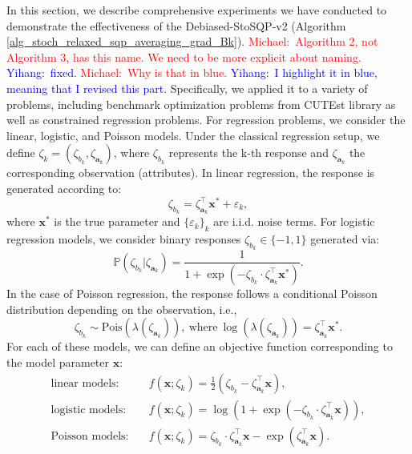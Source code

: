 \documentclass[aos]{imsart}
\numberwithin{equation}{section}
\theoremstyle{plain}
\newcommand{\michael}[1]{\textcolor{red}{Michael:\ #1}}
\newcommand{\yihang}[1]{\textcolor{blue}{Yihang:\ #1}}
\begin{document}
In this section, we describe comprehensive experiments we have conducted to demonstrate the effectiveness of the Debiased-StoSQP-v2 (Algorithm \ref{alg_stoch_relaxed_sqp_averaging_grad_Bk}). 
\michael{Algorithm 2, not Algorithm 3, has this name.  We need to be more explicit about naming.}
\yihang{fixed.}
\michael{Why is that in blue.}
\yihang{I highlight it in blue, meaning that I revised this part.}
Specifically, we applied it to a variety of problems, including benchmark optimization problems from CUTEst library \cite{gould2015cutest, fowkes2022pycutest} as well as constrained regression problems. 
For regression problems, we consider the linear, logistic, and Poisson models.
Under the classical regression setup, we define $\zeta_k = \left(\zeta_{b_k}, \zeta_{\bm{a}_k} \right)$, where $\zeta_{b_k}$ represents the k-th response and $\zeta_{\bm{a}_k}$ the corresponding observation (attributes).
In linear regression, the response is generated according to:
\begin{equation*}
    \zeta_{b_k} = \zeta_{\bm{a}_k}^{\top} \bm{x}^{*} + \varepsilon_k,
\end{equation*}
where $\bm{x}^{*}$ is the true parameter and $\{\varepsilon_k\}_{k}$ are i.i.d. noise terms. For logistic regression models, we consider binary responses $\zeta_{b_k} \in \{-1,1\}$ generated via:
\begin{equation*}
    \mathbb{P}\left(\zeta_{b_k}| \zeta_{\bm{a}_k}\right) = \frac{1}{1 + \exp \left( -\zeta_{b_k} \cdot \zeta_{\bm{a}_k}^{\top} \bm{x}^{*} \right)}.
\end{equation*}
In the case of Poisson regression, the response follows a conditional Poisson distribution depending on the observation, i.e., 
\begin{equation*}
    \zeta_{b_k} \sim \text{Pois}\left( \lambda(\zeta_{\bm{a}_k})\right), ~\text{where}~\log(\lambda(\zeta_{\bm{a}_k})) =  \zeta_{\bm{a}_k}^{\top} \bm{x}^{*}.
\end{equation*}
For each of these models, we can define an objective function corresponding to the model parameter $\bm{x}$:
\begin{equation*}
    \begin{split}
        \text{linear models:} & \hspace{1em} f(\bm{x};\zeta_k) = \frac{1}{2} \left(\zeta_{b_k} - \zeta_{\bm{a}_k}^{\top} \bm{x} \right),\\
        \text{logistic models:} & \hspace{1em} f(\bm{x};\zeta_k) = \log\left(1 + \exp \left( -\zeta_{b_k} \cdot \zeta_{\bm{a}_k}^{\top} \bm{x}  \right) \right),\\
        \text{Poisson models:} & \hspace{1em} f(\bm{x};\zeta_k) = \zeta_{b_k} \cdot \zeta_{\bm{a}_k}^{\top} \bm{x} - \exp \left(\zeta_{\bm{a}_k}^{\top} \bm{x} \right).
    \end{split}
\end{equation*}
\end{document}
